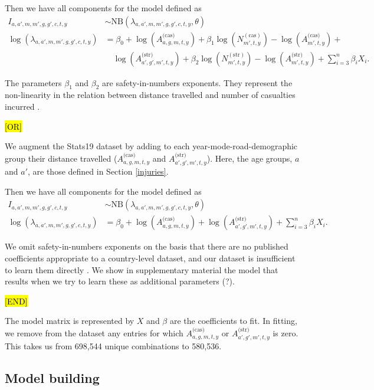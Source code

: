\documentclass{article}
\begin{document}
Then we have all components for the model defined as
\begin{align}
I_{a,a',m,m',g,g',c,t,y}&\sim \text{NB}(\lambda_{a,a',m,m',g,g',c,t,y},\theta) \\
\log\left(\lambda_{a,a',m,m',g,g',c,t,y}\right) &= {\beta_0} +\log(A_{a,g,m,t,y}^{\text{(cas)}})+{\beta_1}\log\left(N_{m',t,y}^{(\text{cas})}\right)-\log(A_{m',t,y}^{\text{(cas)}})+\nonumber\\
&\quad\log(A_{a',g',m',t,y}^{\text{(str)}})+{\beta_2}\log\left(N_{m',t,y}^{(\text{str})}\right)-\log(A_{m',t,y}^{\text{(str)}})+\sum_{i=3}^n\beta_iX_i.
\end{align}

The parameters $\beta_1$ and $\beta_2$ are safety-in-numbers exponents. They represent the non-linearity in the relation between distance travelled and number of casualties incurred \citep{Aldred2017,Elvik2017}. 

\hl{[OR]}

We augment the Stats19 dataset by adding to each year-mode-road-demographic group their distance travelled ($A_{a,g,m,t,y}^{\text{(cas)}}$ and $A_{a',g',m',t,y}^{\text{(str)}}$). Here, the age groups, $a$ and $a'$, are those defined in Section \ref{injuries}.

Then we have all components for the model defined as
\begin{align}
I_{a,a',m,m',g,g',c,t,y}&\sim \text{NB}(\lambda_{a,a',m,m',g,g',c,t,y},\theta) \\
\log\left(\lambda_{a,a',m,m',g,g',c,t,y}\right) &= {\beta_0} +\log(A_{a,g,m,t,y}^{\text{(cas)}})+\log(A_{a',g',m',t,y}^{\text{(str)}})+\sum_{i=3}^n\beta_iX_i.
\end{align}

We omit safety-in-numbers exponents on the basis that there are no published coefficients appropriate to a country-level dataset, and our dataset is insufficient to learn them directly \citep{Aldred2017,Elvik2017}. We show in supplementary material the model that results when we try to learn these as additional parameters (?).



\hl{[END]}

The model matrix is represented by $X$ and $\beta$ are the coefficients to fit. In fitting, we remove from the dataset any entries for which $A_{a,g,m,t,y}^{\text{(cas)}}$ or $A_{a',g',m',t,y}^{\text{(str)}}$ is zero. This takes us from 698,544 unique combinations to 580,536. 


\subsection{Model building}
\end{document}
